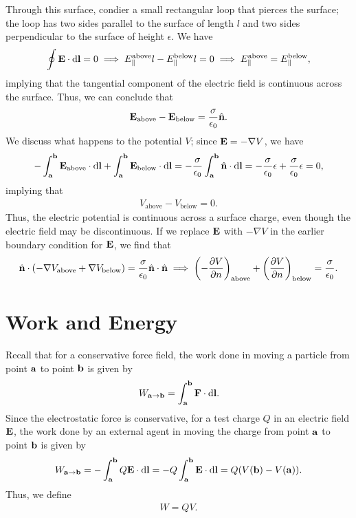 Through this surface, condier a small rectangular loop that pierces the surface; the loop has two sides parallel to the surface of length $l$ and two sides perpendicular to the surface of height $\epsilon$. We have
\begin{align}
    \oint \mathbf{E} \cdot \mathrm{d}\mathbf{l} = 0 \implies E_{\parallel}^{\text{above}} l - E_{\parallel}^{\text{below}} l = 0 \implies E_{\parallel}^{\text{above}} = E_{\parallel}^{\text{below}},
\end{align}
implying that the tangential component of the electric field is continuous across the surface. Thus, we can conclude that
\begin{align}
    \mathbf{E}_{\text{above}} - \mathbf{E}_{\text{below}} = \frac{\sigma}{\epsilon_{0}} \hat{\mathbf{n}}.
\end{align}
We discuss what happens to the potential $V$; since $\mathbf{E} = - \nabla V$, we have
\begin{align}
    - \int_{\mathbf{a}}^{\mathbf{b}} \mathbf{E}_{\text{above}} \cdot \mathrm{d}\mathbf{l} + \int_{\mathbf{a}}^{\mathbf{b}} \mathbf{E}_{\text{below}} \cdot \mathrm{d}\mathbf{l} = -\frac{\sigma}{\epsilon_{0}} \int_{\mathbf{a}}^{\mathbf{b}} \hat{\mathbf{n}} \cdot \mathrm{d}\mathbf{l} = -\frac{\sigma}{\epsilon_{0}} \epsilon + \frac{\sigma}{\epsilon_{0}} \epsilon = 0,
\end{align}
implying that
\begin{align}
    V_{\text{above}} - V_{\text{below}} = 0.
\end{align}
Thus, the electric potential is continuous across a surface charge, even though the electric field may be discontinuous. If we replace $\mathbf{E}$ with $- \nabla V$ in the earlier boundary condition for $\mathbf{E}$, we find that
\begin{align}
    \hat{\mathbf{n}} \cdot \left( -\nabla V_{\text{above}} + \nabla V_{\text{below}} \right) = \frac{\sigma}{\epsilon_{0}} \hat{\mathbf{n}} \cdot \hat{\mathbf{n}} \implies \left(- \frac{\partial V}{\partial n} \right)_{\text{above}} + \left( \frac{\partial V}{\partial n} \right)_{\text{below}} = \frac{\sigma}{\epsilon_{0}}.
\end{align}

\section{Work and Energy}

Recall that for a conservative force field, the work done in moving a particle from point $\mathbf{a}$ to point $\mathbf{b}$ is given by
\begin{align}
    W_{\mathbf{a} \to \mathbf{b}} = \int_{\mathbf{a}}^{\mathbf{b}} \mathbf{F} \cdot \mathrm{d}\mathbf{l}.
\end{align}
Since the electrostatic force is conservative, for a test charge $Q$ in an electric field $\mathbf{E}$, the work done by an external agent in moving the charge from point $\mathbf{a}$ to point $\mathbf{b}$ is given by
\begin{align}
    W_{\mathbf{a} \to \mathbf{b}} = -\int_{\mathbf{a}}^{\mathbf{b}} Q \mathbf{E} \cdot \mathrm{d}\mathbf{l} = -Q \int_{\mathbf{a}}^{\mathbf{b}} \mathbf{E} \cdot \mathrm{d}\mathbf{l} = Q (V(\mathbf{b}) - V(\mathbf{a})).
\end{align}
Thus, we define
\begin{align}
    W = Q V.
\end{align}

